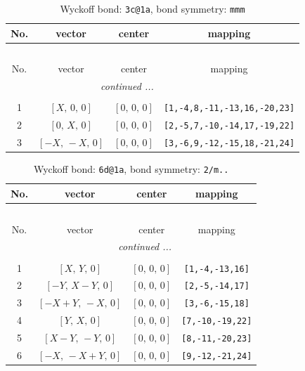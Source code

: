 \documentclass[fleqn,8pt]{jsarticle}
\begin{document}
\renewcommand{\arraystretch}{1.2}
\begin{longtable}{cccc}
\caption{Wyckoff bond: {\tt 3c@1a}, bond symmetry: {\tt mmm}}
 \\
 \hline \hline
No. & vector & center & mapping \\ \hline \endfirsthead

\multicolumn{3}{l}{\tablename\ \thetable{}} \\
 \hline \hline
No. & vector & center & mapping \\ \hline \endhead

 \hline \hline
\multicolumn{3}{r}{\footnotesize\it continued ...} \\ \endfoot

 \hline \hline
\multicolumn{3}{r}{} \\ \endlastfoot

1 & $\left[ X,\, 0,\, 0 \right]$ & $\left[ 0,\, 0,\, 0 \right]$ & {\tt [1,-4,8,-11,-13,16,-20,23]} \\ \hline
2 & $\left[ 0,\, X,\, 0 \right]$ & $\left[ 0,\, 0,\, 0 \right]$ & {\tt [2,-5,7,-10,-14,17,-19,22]} \\ \hline
3 & $\left[ - X,\, - X,\, 0 \right]$ & $\left[ 0,\, 0,\, 0 \right]$ & {\tt [3,-6,9,-12,-15,18,-21,24]} \\
\end{longtable}
\renewcommand{\arraystretch}{1.2}
\begin{longtable}{cccc}
\caption{Wyckoff bond: {\tt 6d@1a}, bond symmetry: {\tt 2/m..}}
 \\
 \hline \hline
No. & vector & center & mapping \\ \hline \endfirsthead

\multicolumn{3}{l}{\tablename\ \thetable{}} \\
 \hline \hline
No. & vector & center & mapping \\ \hline \endhead

 \hline \hline
\multicolumn{3}{r}{\footnotesize\it continued ...} \\ \endfoot

 \hline \hline
\multicolumn{3}{r}{} \\ \endlastfoot

1 & $\left[ X,\, Y,\, 0 \right]$ & $\left[ 0,\, 0,\, 0 \right]$ & {\tt [1,-4,-13,16]} \\ \hline
2 & $\left[ - Y,\, X - Y,\, 0 \right]$ & $\left[ 0,\, 0,\, 0 \right]$ & {\tt [2,-5,-14,17]} \\ \hline
3 & $\left[ - X + Y,\, - X,\, 0 \right]$ & $\left[ 0,\, 0,\, 0 \right]$ & {\tt [3,-6,-15,18]} \\ \hline
4 & $\left[ Y,\, X,\, 0 \right]$ & $\left[ 0,\, 0,\, 0 \right]$ & {\tt [7,-10,-19,22]} \\ \hline
5 & $\left[ X - Y,\, - Y,\, 0 \right]$ & $\left[ 0,\, 0,\, 0 \right]$ & {\tt [8,-11,-20,23]} \\ \hline
6 & $\left[ - X,\, - X + Y,\, 0 \right]$ & $\left[ 0,\, 0,\, 0 \right]$ & {\tt [9,-12,-21,24]} \\
\end{longtable}
\end{document}
